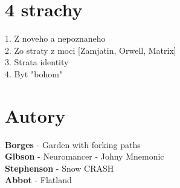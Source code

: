 \documentclass[]{article}
\begin{document}
\section{4 strachy}
1. Z noveho a nepoznaneho \\
2. Zo straty z moci [Zamjatin, Orwell, Matrix] \\
3. Strata identity \\
4. Byt "bohom" \\

\section{Autory}
\textbf{Borges} - Garden with forking paths \\
\textbf{Gibson} - Neuromancer - Johny Mnemonic \\
\textbf{Stephenson} - Snow CRASH \\
\textbf{Abbot} - Flatland
\end{document}
